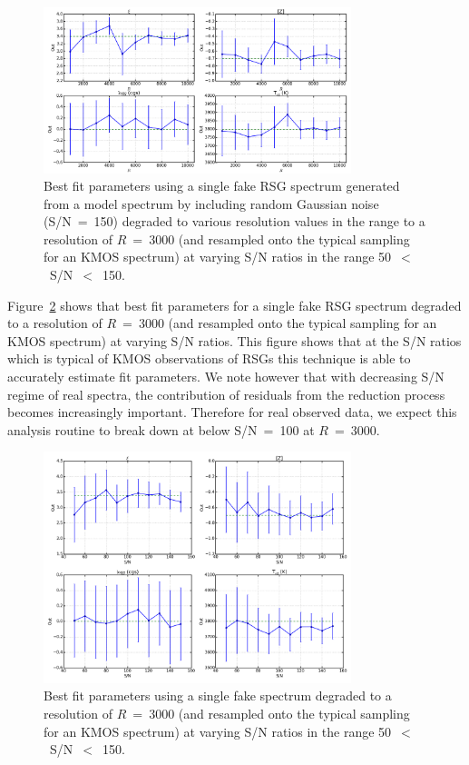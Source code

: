 \begin{figure}
 \centering
 \includegraphics[width=0.80\textwidth]{JAnal/Fakespec-tres-v1}
 \caption[A test to measure the effects of varying the resolution on the best-fit parameters]{
Best fit parameters using a single fake RSG spectrum generated from a model spectrum by including random Gaussian noise (S/N~=~150) degraded to various resolution values in the range  to a resolution of $R$~=~3000 (and resampled onto the typical sampling for an KMOS spectrum) at varying S/N ratios in the range 50~$<$~S/N~$<$~150.
\label{fig:tres}
         }
\end{figure}

Figure~\ref{fig:snr} shows that best fit parameters for a single fake RSG spectrum degraded to a resolution of $R$~=~3000 (and resampled onto the typical sampling for an KMOS spectrum) at varying S/N ratios.
This figure shows that at the S/N ratios which is typical of KMOS observations of RSGs this technique is able to accurately estimate fit parameters.
We note however that with decreasing S/N regime of real spectra, the contribution of residuals from the reduction process becomes increasingly important.
Therefore for real observed data, we expect this analysis routine to break down at below S/N~=~100 at $R$~=~3000.

\begin{figure}
 \centering
 \includegraphics[width=0.80\textwidth]{JAnal/Fakespec-tsnr-v1}
 \caption[A test to measure the effects of varying the S/N on the best-fit parameters]{
Best fit parameters using a single fake spectrum degraded to a resolution of $R$~=~3000 (and resampled onto the typical sampling for an KMOS spectrum) at varying S/N ratios in the range 50~$<$~S/N~$<$~150.
\label{fig:snr}
         }
\end{figure}


